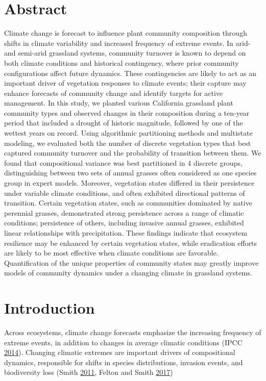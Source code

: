 \documentclass[twoside,12pt,final]{ucthesis-CA2012}
\begin{document}
\begin{ucmainmatter}
{\section{Abstract}\label{abstract}}

Climate change is forecast to influence plant community composition through shifts in climate variability and increased frequency of extreme events.
In arid- and semi-arid grassland systems, community turnover is known to depend on both climate conditions and historical contingency, where prior community configurations affect future dynamics.
These contingencies are likely to act as an important driver of vegetation responses to climate events; their capture may enhance forecasts of community change and identify targets for active management.
In this study, we planted various California grassland plant community types and observed changes in their composition during a ten-year period that included a drought of historic magnitude, followed by one of the wettest years on record. Using algorithmic partitioning methods and multistate modeling, we evaluated both the number of discrete vegetation types that best captured community turnover and the probability of transition between them.
We found that compositional variance was best partitioned in 4 discrete groups, distinguishing between two sets of annual grasses often considered as one species group in expert models.
Moreover, vegetation states differed in their persistence under variable climate conditions, and often exhibited directional patterns of transition.
Certain vegetation states, such as communities dominated by native perennial grasses, demonstrated strong persistence across a range of climatic conditions;
persistence of others, including invasive annual grasses, exhibited linear relationships with precipitation.
These findings indicate that ecosystem resilience may be enhanced by certain vegetation states, while eradication efforts are likely to be most effective when climate conditions are favorable.
Quantification of the unique properties of community states may greatly improve models of community dynamics under a changing climate in grassland systems.

\hypertarget{introduction}{%
\section{Introduction}\label{introduction}}

Across ecosystems, climate change forecasts emphasize the increasing frequency of extreme events, in addition to changes in average climatic conditions (IPCC \protect\hyperlink{ref-IPCC2014}{2014}).
Changing climatic extremes are important drivers of compositional dynamics, responsible for shifts in species distributions, invasion events, and biodiversity loss (Smith \protect\hyperlink{ref-Smith2011b}{2011}, Felton and Smith \protect\hyperlink{ref-Felton2017}{2017})


\end{ucmainmatter}
\end{document}
